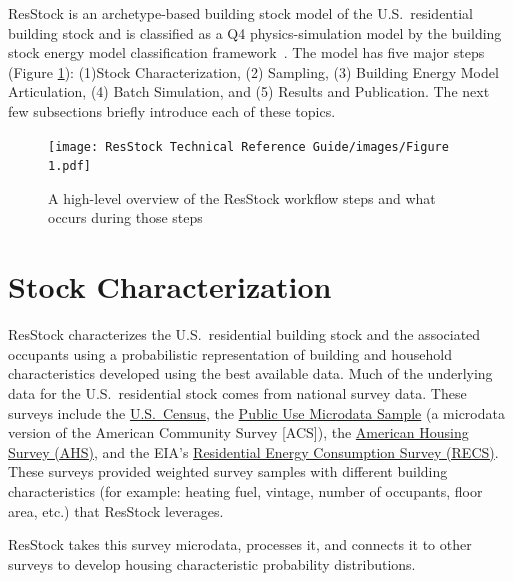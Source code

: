 ResStock is an archetype-based building stock model of the U.S.~residential building stock and is classified as a Q4 physics-simulation model by the building stock energy model classification framework~\citep{Langevin2020}. The model has five major steps (Figure \ref{fig:workflow_overview}): (1)Stock Characterization, (2) Sampling, (3) Building Energy Model Articulation, (4) Batch Simulation, and (5) Results and Publication. The next few subsections briefly introduce each of these topics.

\begin{figure}
    \centering
    \texttt{[image: ResStock Technical Reference Guide/images/Figure 1.pdf]}
    \caption{A high-level overview of the ResStock workflow steps and what occurs during those steps}
    \label{fig:workflow_overview}
\end{figure}

\section{Stock Characterization}
ResStock characterizes the U.S.~residential building stock and the associated occupants using a probabilistic representation of building and household characteristics developed using the best available data. Much of the underlying data for the U.S.~residential stock comes from national survey data. These surveys include the \href{https://data.census.gov/}{U.S.~Census}, the \href{https://www.census.gov/programs-surveys/acs/microdata.html}{Public Use Microdata Sample} (a microdata version of the American Community Survey [ACS]), the \href{https://www.census.gov/programs-surveys/ahs.html}{American Housing Survey (AHS)}, and the EIA's \href{https://www.eia.gov/consumption/residential/}{Residential Energy Consumption Survey (RECS)}. These surveys provided weighted survey samples with different building characteristics (for example: heating fuel, vintage, number of occupants, floor area, etc.) that ResStock leverages.

ResStock takes this survey microdata, processes it, and connects it to other surveys to develop housing characteristic probability distributions. 

 

